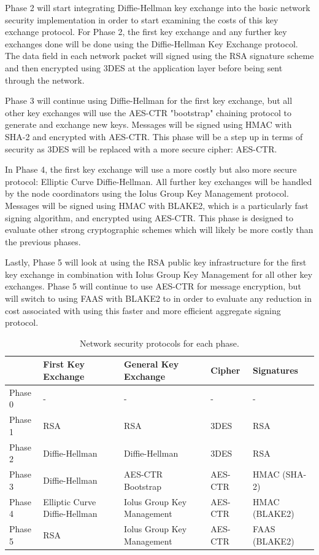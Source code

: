 \documentclass[tikz,a4paper,titlepage]{article}
\begin{document}
Phase 2 will start integrating Diffie-Hellman key exchange into the basic network security implementation in order to start examining the costs of this key exchange protocol. For Phase 2, the first key exchange and any further key exchanges done will be done using the Diffie-Hellman Key Exchange protocol. The data field in each network packet will signed using the RSA signature scheme and then encrypted using 3DES at the application layer before being sent through the network.

Phase 3 will continue using Diffie-Hellman for the first key exchange, but all other key exchanges will use the AES-CTR "bootstrap" chaining protocol to generate and exchange new keys. Messages will be signed using HMAC with SHA-2 and encrypted with AES-CTR. This phase will be a step up in terms of security as 3DES will be replaced with a more secure cipher: AES-CTR. 

In Phase 4, the first key exchange will use a more costly but also more secure protocol: Elliptic Curve Diffie-Hellman. All further key exchanges will be handled by the node coordinators using the Iolus Group Key Management protocol. Messages will be signed using HMAC with BLAKE2, which is a particularly fast signing algorithm, and encrypted using AES-CTR. This phase is designed to evaluate other strong cryptographic schemes which will likely be more costly than the previous phases.

Lastly, Phase 5 will look at using the RSA public key infrastructure for the first key exchange in combination with Iolus Group Key Management for all other key exchanges. Phase 5 will continue to use AES-CTR for message encryption, but will switch to using FAAS with BLAKE2 to in order to evaluate any reduction in cost associated with using this faster and more efficient aggregate signing protocol. 


\begin{table}[h]
\centering
\begin{tabular}{|l|l|l|l|l|}
\hline
        & First Key Exchange & General Key Exchange & Cipher & Signatures \\ \hline
Phase 0 & - & - & - & - \\ \hline
Phase 1 & RSA & RSA & 3DES & RSA \\ \hline
Phase 2 & Diffie-Hellman & Diffie-Hellman & 3DES & RSA \\ \hline
Phase 3 & Diffie-Hellman & AES-CTR Bootstrap & AES-CTR & HMAC (SHA-2) \\ \hline
Phase 4 & Elliptic Curve Diffie-Hellman & Iolus Group Key Management & AES-CTR & HMAC (BLAKE2) \\ \hline
Phase 5 & RSA & Iolus Group Key Management & AES-CTR & FAAS (BLAKE2) \\ \hline
\end{tabular}

\caption{Network security protocols for each phase.}
\label{ResearchPhases}
\end{table}
\end{document}
